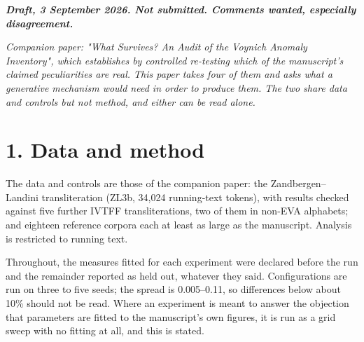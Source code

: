 \documentclass[11pt,a4paper]{article}
\begin{document}
\begin{abstract}
We then test our own architecture against measures it was not fitted to, and half the result evaporates: 88.9\% of its output consists of actual manuscript words, so its vocabulary statistics test identity rather than architecture. Of nine held-out measures only two are informative; it passes one and fails the other --- the line-start divergence --- completely, because it has no notion of a line.


Adding the line takes two rules rather than the one the audit proposed. Prepending a character accounts for the length of line-initial words --- the mean gain is +0.400, and the estimator is unbiased in the generator --- but at that rate it produces less than half the observed first-character divergence, and no choice of character pool rescues it. An operation that changes the opening character without changing the length closes the gap and costs nothing on two held-out measures. We also withdraw, in \S8.3, a claim made the same day, because its null model destroyed the mechanism whose sufficiency was in question.
\end{abstract}

\begin{center}\small\itshape
\textbf{Draft, 3 September 2026. Not submitted. Comments wanted, especially disagreement.}


\emph{Companion paper: "What Survives? An Audit of the Voynich Anomaly Inventory", which establishes by controlled re-testing which of the manuscript's claimed peculiarities are real. This paper takes four of them and asks what a generative mechanism would need in order to produce them. The two share data and controls but not method, and either can be read alone.}
\end{center}

\section*{1. Data and method}


The data and controls are those of the companion paper: the Zandbergen--Landini transliteration (ZL3b, 34,024 running-text tokens), with results checked against five further IVTFF transliterations, two of them in non-EVA alphabets; and eighteen reference corpora each at least as large as the manuscript. Analysis is restricted to running text.


Throughout, the measures fitted for each experiment were declared before the run and the remainder reported as held out, whatever they said. Configurations are run on three to five seeds; the spread is 0.005--0.11, so differences below about 10\% should not be read. Where an experiment is meant to answer the objection that parameters are fitted to the manuscript's own figures, it is run as a grid sweep with no fitting at all, and this is stated.
\end{document}
